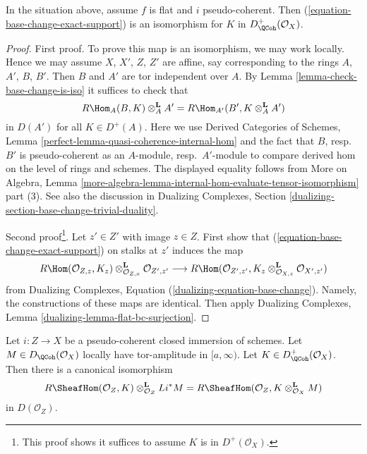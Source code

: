 \begin{lemma}
\label{lemma-flat-bc-sheaf-with-exact-support}
In the situation above, assume $f$ is flat and $i$ pseudo-coherent.
Then (\ref{equation-base-change-exact-support}) is an isomorphism
for $K$ in $D^+_\QCoh(\mathcal{O}_X)$.
\end{lemma}

\begin{proof}
First proof. To prove this map is an isomorphism, we may work locally.
Hence we may assume $X$, $X'$, $Z$, $Z'$ are affine, say corresponding
to the rings $A$, $A'$, $B$, $B'$. Then $B$ and $A'$ are tor independent
over $A$. By Lemma \ref{lemma-check-base-change-is-iso} it suffices
to check that
$$
R\Hom_A(B, K) \otimes_A^\mathbf{L} A' =
R\Hom_{A'}(B', K \otimes_A^\mathbf{L} A')
$$
in $D(A')$ for all $K \in D^+(A)$. Here we use
Derived Categories of Schemes, Lemma
\ref{perfect-lemma-quasi-coherence-internal-hom}
and the fact that $B$, resp.\ $B'$ is pseudo-coherent as an
$A$-module, resp.\ $A'$-module
to compare derived hom on the level of rings and schemes.
The displayed equality follows from
More on Algebra, Lemma
\ref{more-algebra-lemma-internal-hom-evaluate-tensor-isomorphism}
part (3). See also the discussion in Dualizing Complexes, Section
\ref{dualizing-section-base-change-trivial-duality}.

\medskip\noindent
Second proof\footnote{This proof shows
it suffices to assume $K$ is in $D^+(\mathcal{O}_X)$.}.
Let $z' \in Z'$ with image $z \in Z$.
First show that (\ref{equation-base-change-exact-support})
on stalks at $z'$ induces the map
$$
R\Hom(\mathcal{O}_{Z, z}, K_z)
\otimes_{\mathcal{O}_{Z, x}}^\mathbf{L} \mathcal{O}_{Z', z'}
\longrightarrow
R\Hom(\mathcal{O}_{Z', z'},
K_z \otimes_{\mathcal{O}_{X, z}}^\mathbf{L} \mathcal{O}_{X', z'})
$$
from Dualizing Complexes, Equation (\ref{dualizing-equation-base-change}).
Namely, the constructions of these maps are identical.
Then apply Dualizing Complexes, Lemma \ref{dualizing-lemma-flat-bc-surjection}.
\end{proof}

\begin{lemma}
\label{lemma-sheaf-with-exact-support-tensor}
Let $i : Z \to X$ be a pseudo-coherent closed immersion of schemes.
Let $M \in D_\QCoh(\mathcal{O}_X)$ locally have tor-amplitude in $[a, \infty)$.
Let $K \in D_\QCoh^+(\mathcal{O}_X)$. Then there is a canonical isomorphism
$$
R\SheafHom(\mathcal{O}_Z, K) \otimes_{\mathcal{O}_Z}^\mathbf{L} Li^*M =
R\SheafHom(\mathcal{O}_Z, K \otimes_{\mathcal{O}_X}^\mathbf{L} M)
$$
in $D(\mathcal{O}_Z)$.
\end{lemma}

